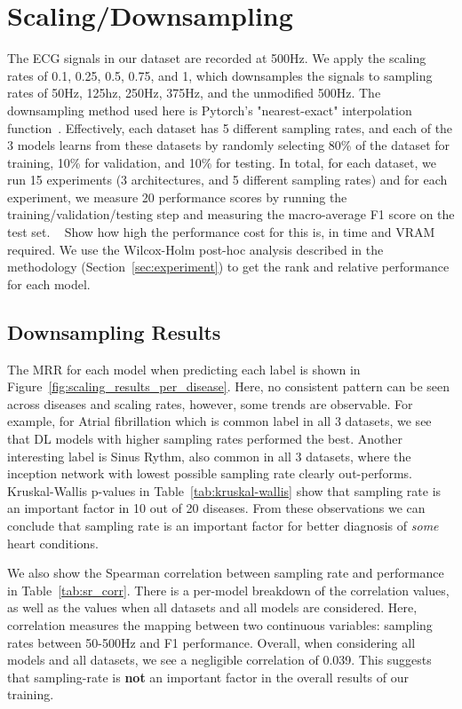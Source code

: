\documentclass[pmlr,twocolumn]{jmlr}%
\begin{document}
\section{Scaling/Downsampling}
\label{sec:scaling}
The ECG signals in our dataset are recorded at 500Hz. We apply the  scaling rates of 0.1, 0.25, 0.5, 0.75, and 1, which downsamples the signals to sampling rates of 50Hz, 125hz, 250Hz, 375Hz, and the unmodified 500Hz. The downsampling method used here is Pytorch's "nearest-exact" interpolation function~\cite{NEURIPS2019_9015}. Effectively, each dataset has 5 different sampling rates, and each of the 3 models learns from these datasets by randomly selecting 80\% of the dataset for training, 10\% for validation, and 10\% for testing. In total, for each dataset, we run 15 experiments (3 architectures, and 5 different sampling rates) and for each experiment, we measure 20 performance scores by running the training/validation/testing step and measuring the macro-average F1 score on the test set.
~{\color{red} Show how high the performance cost for this is, in time and VRAM required}. We use the Wilcox-Holm post-hoc analysis described in the methodology (Section~\ref{sec:experiment}) to get the rank and relative performance for each model. 
\subsection{Downsampling Results}
\label{sec_ds_results}
The MRR for each model when predicting each label is shown in Figure~\ref{fig:scaling_results_per_disease}. Here, no consistent pattern can be seen across diseases and scaling rates, however, some trends are observable. For example, for Atrial fibrillation which is common label in all 3 datasets, we see that DL models with higher sampling rates performed the best. Another interesting label is Sinus Rythm, also common in all 3 datasets,  where the inception network with lowest possible sampling rate clearly out-performs. Kruskal-Wallis p-values in Table~\ref{tab:kruskal-wallis} show that sampling rate is an important factor in 10 out of 20 diseases. From these observations we can conclude that sampling rate is an important factor for better diagnosis of \textit{some} heart conditions.

We also show the Spearman correlation between sampling rate and performance in Table~\ref{tab:sr_corr}. There is a per-model breakdown of the correlation values, as well as the values when all datasets and all models are considered. Here, correlation measures the mapping between two continuous variables: sampling rates between 50-500Hz and F1 performance. Overall, when considering all models and all datasets, we see a negligible correlation of 0.039. This suggests that sampling-rate is \textbf{not} an important factor in the overall results of our training. 
\end{document}
